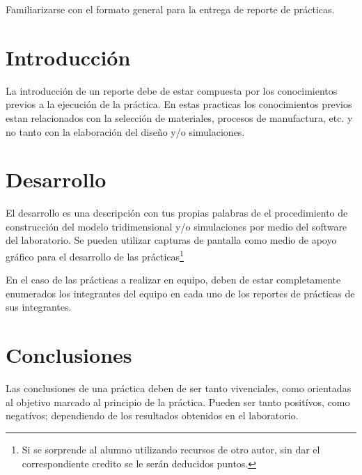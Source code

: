 	Familiarizarse con el formato general para la entrega de reporte de prácticas.


\section{Introducción}

	La introducción de un reporte debe de estar compuesta por los conocimientos previos a la ejecución de la práctica. En estas practicas los conocimientos previos estan relacionados con la selección de materiales, procesos de manufactura, etc. y no tanto con la elaboración del diseño y/o simulaciones.


\section{Desarrollo}

	El desarrollo es una descripción con tus propias palabras de el procedimiento de construcción del modelo tridimensional y/o simulaciones por medio del software del laboratorio. Se pueden utilizar capturas de pantalla como medio de apoyo gráfico para el desarrollo de las prácticas\footnote{Si se sorprende al alumno utilizando recursos de otro autor, sin dar el correspondiente credito se le serán deducidos puntos.}

    En el caso de las prácticas a realizar en equipo, deben de estar completamente enumerados los integrantes del equipo en cada uno de los reportes de prácticas de sus integrantes.


\section{Conclusiones}
	Las conclusiones de una práctica deben de ser tanto vivenciales, como orientadas al objetivo marcado al principio de la práctica. Pueden ser tanto positívos, como negatívos; dependiendo de los resultados obtenidos en el laboratorio.

